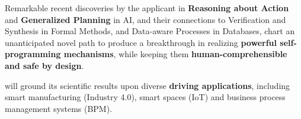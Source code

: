 Remarkable recent discoveries by the applicant in \textbf{Reasoning about Action} and \textbf {Generalized Planning} in AI, %
and their connections to
Verification and Synthesis in Formal Methods, and Data-aware Processes in Databases, chart an unanticipated novel path to produce a breakthrough in realizing \textbf{powerful self-programming mechanisms}, while keeping them  \textbf{human-comprehensible and safe by design}.



\project will ground its scientific results upon diverse
\textbf{driving applications}, including smart manufacturing
(Industry 4.0), smart spaces (IoT) and business process management systems
(BPM).

 



